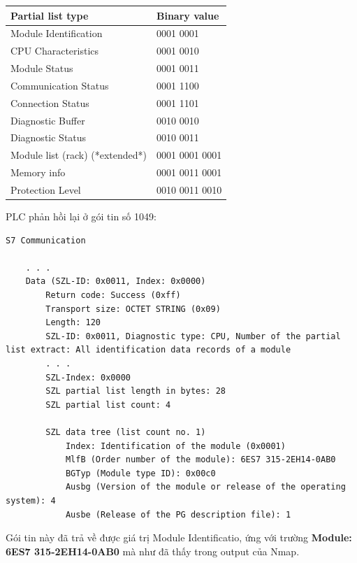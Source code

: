 \documentclass[../main.tex]{subfiles}
\begin{document}
\begin{enumerate}
\begin{table}[H]
    \centering
    \footnotesize
    \begin{tabular}{|l|l|}
        \hline
        \textbf{Partial list type} & \textbf{Binary value} \\
        \hline
        Module Identification & 0001 0001 \\
        \hline
        CPU Characteristics & 0001 0010 \\
        \hline
        Module Status & 0001 0011 \\
        \hline
        Communication Status & 0001 1100 \\
        \hline
        Connection Status & 0001 1101 \\
        \hline
        Diagnostic Buffer & 0010 0010 \\
        \hline
        Diagnostic Status & 0010 0011 \\
        \hline
        Module list (rack)  (*extended*) & 0001 0001 0001 \\
        \hline
        Memory info & 0001 0011 0001 \\
        \hline
        Protection Level & 0010 0011 0010 \\
        \hline
    \end{tabular}
\end{table}


PLC phản hồi lại ở gói tin số 1049:


\begin{verbatim}
S7 Communication
    
    . . .
    Data (SZL-ID: 0x0011, Index: 0x0000)
        Return code: Success (0xff)
        Transport size: OCTET STRING (0x09)
        Length: 120
        SZL-ID: 0x0011, Diagnostic type: CPU, Number of the partial list extract: All identification data records of a module
        . . .
        SZL-Index: 0x0000
        SZL partial list length in bytes: 28
        SZL partial list count: 4

        SZL data tree (list count no. 1)
            Index: Identification of the module (0x0001)
            MlfB (Order number of the module): 6ES7 315-2EH14-0AB0 
            BGTyp (Module type ID): 0x00c0
            Ausbg (Version of the module or release of the operating system): 4
            Ausbe (Release of the PG description file): 1
\end{verbatim}


Gói tin này đã trả về được giá trị Module Identificatio, ứng với trường \textbf{Module: 6ES7 315-2EH14-0AB0} mà như đã thấy trong output của Nmap.



\end{enumerate}
\end{document}
